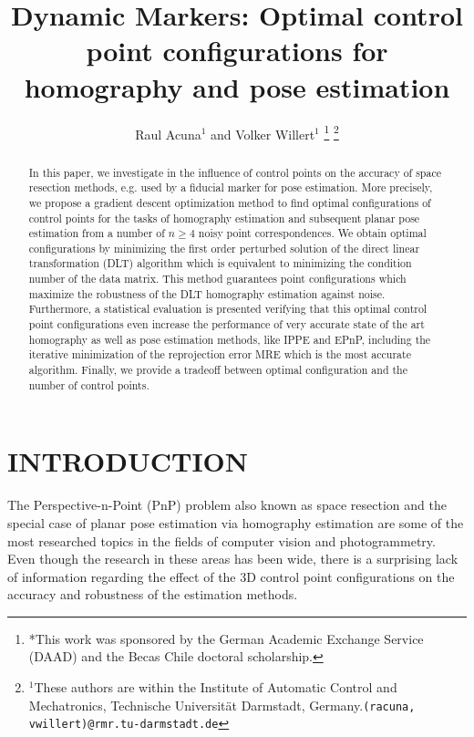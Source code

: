 \documentclass[letterpaper, 10 pt, conference]{ieeeconf}  %
\title{\LARGE \bf
	Dynamic Markers: Optimal control point configurations for homography and pose estimation
}
\author{Raul Acuna$^{1}$ and Volker Willert$^{1}$%
	\thanks{*This work was sponsored by the German Academic Exchange Service (DAAD) and the Becas Chile doctoral scholarship.}%
	\thanks{$^{1}$These authors are within the Institute of Automatic Control and Mechatronics, Technische Universit{\"a}t Darmstadt, Germany.{\tt\small (racuna, vwillert)}{\tt\small @rmr.tu-darmstadt.de}}}
\begin{document}
	\maketitle
	\thispagestyle{empty}
	\pagestyle{empty}
	\begin{abstract}
		In this paper, we investigate in the influence of control points on the accuracy of space resection methods, e.g. used by a fiducial marker for pose estimation. More precisely, we propose a gradient descent optimization method to find optimal configurations of control points for the tasks of homography estimation and subsequent planar pose estimation from a number of $n \geq 4$ noisy point correspondences. We obtain optimal configurations by minimizing the first order perturbed solution of the direct linear transformation (DLT) algorithm which is equivalent to minimizing the condition number of the data matrix. This method guarantees point configurations which maximize the robustness of the DLT homography estimation against noise. Furthermore, a statistical evaluation is presented verifying that this optimal control point configurations even increase the performance of very accurate state of the art homography as well as pose estimation methods, like IPPE and EPnP, including the iterative minimization of the reprojection error MRE which is the most accurate algorithm. Finally, we provide a tradeoff between optimal configuration and the number of control points.
	\end{abstract}
	
	
	\section{INTRODUCTION}
	The Perspective-n-Point (PnP) problem also known as space resection and the special case of planar pose estimation via homography estimation are some of the most researched topics in the fields of computer vision and photogrammetry. Even though the research in these areas has been wide, there is a surprising lack of information regarding the effect of the 3D control point configurations on the accuracy and robustness of the estimation methods.
	
\end{document}
